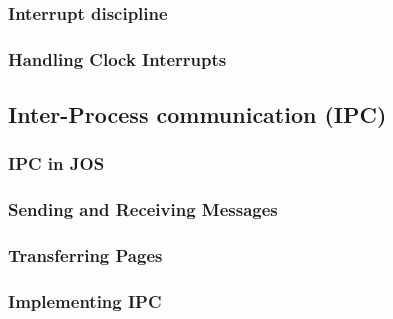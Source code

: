 \documentclass{article}
\begin{document}
\begin{CJK*}{UTF8}{gkai}
\subsubsection{Interrupt discipline}

\subsubsection{Handling Clock Interrupts}

\subsection{Inter-Process communication (IPC)}

\subsubsection{IPC in JOS}

\subsubsection{Sending and Receiving Messages}

\subsubsection{Transferring Pages}

\subsubsection{Implementing IPC}


\begin{lstlisting}[style=console]
\end{lstlisting}

\begin{lstlisting}[style=console]
\end{lstlisting}



\begin{lstlisting}[style=exercise]
\end{lstlisting}


\begin{lstlisting}[style=exercise]
\end{lstlisting}

\begin{lstlisting}[style=exercise]
\end{lstlisting}


\begin{lstlisting}[style=exercise]
\end{lstlisting}


\end{CJK*}
\end{document}
